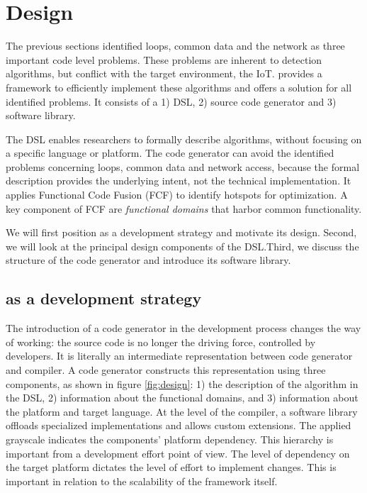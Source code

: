 \documentclass[3p,times,procedia]{elsarticle}
\begin{document}
\section{Design}
\label{design}

The previous sections identified loops, common data and the network as three
important code level problems. These problems are inherent to detection
algorithms, but conflict with the target environment, the IoT\@. \FOO provides
a framework to efficiently implement these algorithms and offers a solution for
all identified problems. It consists of a 1) DSL, 2) source code generator and
3) software library.

The DSL enables researchers to formally describe algorithms, without focusing
on a specific language or platform. The code generator can avoid the identified
problems concerning loops, common data and network access, because the formal
description provides the underlying intent, not the technical implementation.
It applies Functional Code Fusion (FCF) to identify hotspots for optimization.
A key component of FCF are \emph{functional domains} that harbor common
functionality.

We will first position \FOO as a development strategy and motivate its design.
Second, we will look at the principal design components of the DSL.\@ Third, we
discuss the structure of the code generator and introduce its software library.

\subsection{\FOO as a development strategy}
\label{positioning}

The introduction of a code generator in the development process changes the way
of working: the source code is no longer the driving force, controlled by
developers. It is literally an intermediate representation between code
generator and compiler. A code generator constructs this representation using
three components, as shown in figure \ref{fig:design}: 1) the description of
the algorithm in the DSL, 2) information about the functional domains, and 3)
information about the platform and target language. At the level of the
compiler, a software library offloads specialized implementations and allows
custom extensions. The applied grayscale indicates the components' platform
dependency. This hierarchy is important from a development effort point of
view. The level of dependency on the target platform dictates the level of
effort to implement changes. This is important in relation to the scalability
of the framework itself.
\end{document}
